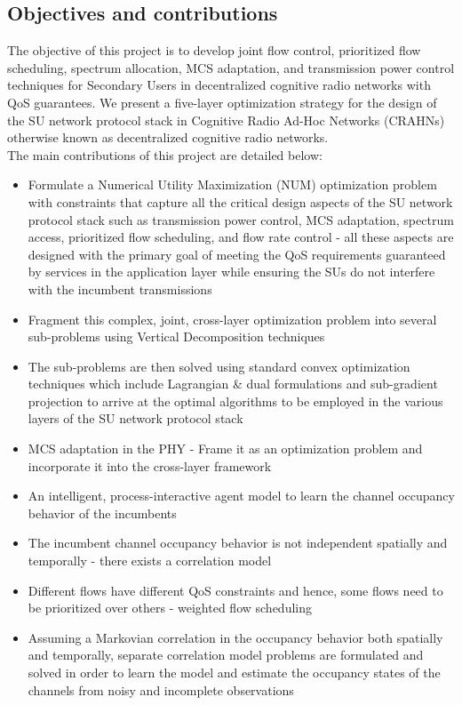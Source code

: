 \documentclass[12pt, draftcls, onecolumn]{IEEEtran}
\begin{document}
\subsection{Objectives and contributions}
The objective of this project is to develop joint flow control, prioritized flow scheduling, spectrum allocation, MCS adaptation, and transmission power control techniques for Secondary Users in decentralized cognitive radio networks with QoS guarantees. We present a five-layer optimization strategy for the design of the SU network protocol stack in Cognitive Radio Ad-Hoc Networks (CRAHNs) otherwise known as decentralized cognitive radio networks.
\\The main contributions of this project are detailed below:
\begin{itemize}
    \item Formulate a Numerical Utility Maximization (NUM) optimization problem with constraints that capture all the critical design aspects of the SU network protocol stack such as transmission power control, MCS adaptation, spectrum access, prioritized flow scheduling, and flow rate control - all these aspects are designed with the primary goal of meeting the QoS requirements guaranteed by services in the application layer while ensuring the SUs do not interfere with the incumbent transmissions
    \item Fragment this complex, joint, cross-layer optimization problem into several sub-problems using Vertical Decomposition techniques
    \item The sub-problems are then solved using standard convex optimization techniques which include Lagrangian \& dual formulations and sub-gradient projection to arrive at the optimal algorithms to be employed in the various layers of the SU network protocol stack
    \item MCS adaptation in the PHY - Frame it as an optimization problem and incorporate it into the cross-layer framework
    \item An intelligent, process-interactive agent model to learn the channel occupancy behavior of the incumbents
    \item The incumbent channel occupancy behavior is not independent spatially and temporally - there exists a correlation model
    \item Different flows have different QoS constraints and hence, some flows need to be prioritized over others - weighted flow scheduling
    \item Assuming a Markovian correlation in the occupancy behavior both spatially and temporally, separate correlation model problems are formulated and solved in order to learn the model and estimate the occupancy states of the channels from noisy and incomplete observations

\end{itemize}
\end{document}
